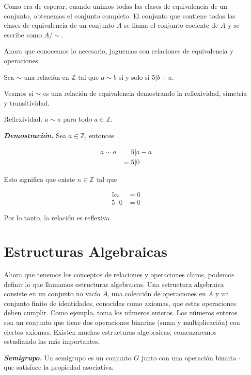 \documentclass{report}
\begin{document}
Como era de esperar, cuando unimos todas las clases de equivalencia de un conjunto, obtenemos el conjunto completo. El conjunto que contiene todas las clases de equivalencia de un conjunto $A$ se llama el conjunto cociente de $A$ y se escribe como $A/\sim$.

Ahora que conocemos lo necesario, juguemos con relaciones de equivalencia y operaciones.

Sea $\sim$ una relación en $\mathbb{Z}$ tal que $a \sim b$ si y solo si $5|b-a$.

Veamos si $\sim$ es una relación de equivalencia demostrando la reflexividad, simetría y transitividad.

Reflexividad. $a \sim a$ para todo $a \in \mathbb{Z}$.

\textit{\textbf{Demostración.}} Sea $a \in \mathbb{Z}$, entonces

\begin{align*}
    a \sim a &= 5|a-a\\
    &= 5|0
\end{align*}

Esto significa que existe $n \in \mathbb{Z}$ tal que

\begin{align*}
    5n &= 0\\
    5\cdot 0 &= 0
\end{align*}

Por lo tanto, la relación es reflexiva.

\section{Estructuras Algebraicas}

Ahora que tenemos los conceptos de relaciones y operaciones claros, podemos definir lo que llamamos estructuras algebraicas. Una estructura algebraica consiste en un conjunto no vacío $A$, una colección de operaciones en $A$ y un conjunto finito de identidades, conocidas como axiomas, que estas operaciones deben cumplir. Como ejemplo, toma los números enteros. Los números enteros son un conjunto que tiene dos operaciones binarias (suma y multiplicación) con ciertos axiomas. Existen muchas estructuras algebraicas, comenzaremos estudiando las más importantes.

\begin{defBox}
    \textit{\textbf{Semigrupo.}} Un semigrupo es un conjunto $G$ junto con una operación binaria $\cdot$ que satisface la propiedad asociativa.
\end{defBox}
\end{document}
